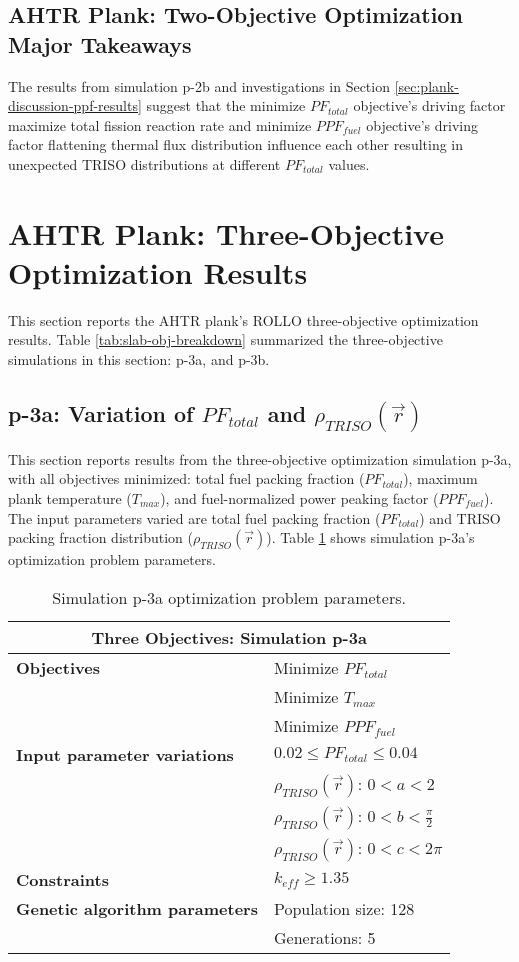 \subsection{AHTR Plank: Two-Objective Optimization Major Takeaways}
The results from simulation p-2b and investigations in Section 
\ref{sec:plank-discussion-ppf-results} suggest that the minimize $PF_{total}$ 
objective's driving factor maximize total fission reaction rate and 
minimize $PPF_{fuel}$ objective's driving factor flattening thermal flux distribution 
influence each other resulting in unexpected TRISO distributions at different 
$PF_{total}$ values. 

\section{AHTR Plank: Three-Objective Optimization Results}
\label{sec:plank-three-obj}
This section reports the \gls{AHTR} plank's \gls{ROLLO} three-objective 
optimization results. 
Table \ref{tab:slab-obj-breakdown} summarized the three-objective simulations in this 
section: p-3a, and p-3b. 

\subsection{p-3a: Variation of $PF_{total}$ and $\rho_{TRISO}(\vec{r})$}
\label{sec:p-3a}
This section reports results from the three-objective optimization simulation p-3a, 
with all objectives minimized: total fuel packing fraction ($PF_{total}$), 
maximum plank temperature ($T_{max}$), and fuel-normalized power peaking factor 
($PPF_{fuel}$).  
The input parameters varied are total fuel packing fraction ($PF_{total}$) and 
TRISO packing fraction distribution ($\rho_{TRISO}(\vec{r})$). 
Table \ref{tab:simulationp3a} shows simulation p-3a's optimization problem parameters. 
\begin{table}[htbp!]
    \centering
    \onehalfspacing
    \caption{Simulation p-3a optimization problem parameters.}
	\label{tab:simulationp3a}
    \footnotesize
    \begin{tabular}{l|p{4cm}}
    \hline 
    \multicolumn{2}{c}{\textbf{Three Objectives: Simulation p-3a}} \\
    \hline 
    \textbf{Objectives} & Minimize $PF_{total}$ \\
    & Minimize $T_{max}$ \\
    & Minimize $PPF_{fuel}$ \\
    \hline 
    \textbf{Input parameter variations} & $0.02 \leq PF_{total} \leq 0.04$ \\
    & $\rho_{TRISO}(\vec{r})$: $0<a<2$ \\
    & $\rho_{TRISO}(\vec{r})$: $0<b<\frac{\pi}{2}$ \\
    & $\rho_{TRISO}(\vec{r})$: $0<c<2\pi$ \\
    \hline
    \textbf{Constraints} & $k_{eff} \geq 1.35$\\ 
    \hline 
    \textbf{Genetic algorithm parameters} & Population size: 128 \\
    & Generations: 5 \\
    \hline
    \end{tabular}
\end{table}

